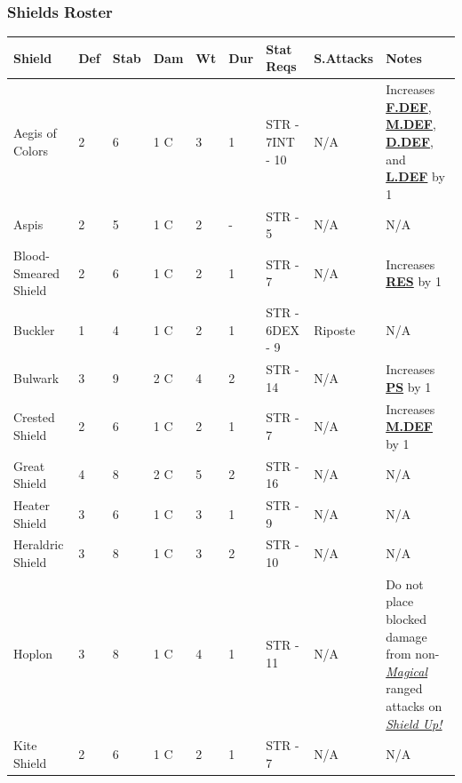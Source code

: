\documentclass[12pt]{article}
\newcommand{\refto}[1]{\hyperlink{#1}{\textbf{#1}}}
\newcommand{\reftoit}[1]{\hyperlink{#1}{\emph{#1}}}
\begin{document}
\subsubsection*{Shields Roster}
\begin{center}
\begin{tabularx}{\textwidth}{p{}p{}p{}p{}p{}p{}p{}p{}p{}}
\hline
\rowcolor{white} \textbf{Shield} & \textbf{Def} & \textbf{Stab} & \textbf{Dam} & \textbf{Wt} & \textbf{Dur} & \textbf{Stat Reqs} & \textbf{S.Attacks} & \textbf{Notes}\setcounter{rownum}{0}\\
\hline
Aegis of Colors & 2 & 6 & 1 C & 3 & 1 & STR - 7\newline INT - 10 & N/A & Increases \refto{F.DEF}, \refto{M.DEF}, \refto{D.DEF}, and \refto{L.DEF} by 1\\
Aspis & 2 & 5 & 1 C & 2 & - & STR - 5 & N/A & N/A\\
Blood-Smeared Shield & 2 & 6 & 1 C & 2 & 1 & STR - 7 & N/A & Increases \refto{RES} by 1\\
Buckler & 1 & 4 & 1 C & 2 & 1 & STR - 6\newline DEX - 9 & Riposte & N/A\\
Bulwark & 3 & 9 & 2 C & 4 & 2 & STR - 14 & N/A & Increases \refto{PS} by 1\\
Crested Shield & 2 & 6 & 1 C & 2 & 1 & STR - 7 & N/A & Increases \refto{M.DEF} by 1\\
Great Shield & 4 & 8 & 2 C & 5 & 2 & STR - 16 & N/A & N/A\\
Heater Shield & 3 & 6 & 1 C & 3 & 1 & STR - 9 & N/A & N/A\\
Heraldric Shield & 3 & 8 & 1 C & 3 & 2 & STR - 10 & N/A & N/A\\
Hoplon & 3 & 8 & 1 C & 4 & 1 & STR - 11 & N/A & Do not place blocked damage from non-\reftoit{Magical} ranged attacks on \reftoit{Shield Up!}\\
Kite Shield & 2 & 6 & 1 C & 2 & 1 & STR - 7 & N/A & N/A\\
\hline
\end{tabularx}
\end{center}

\pagebreak
\end{document}
